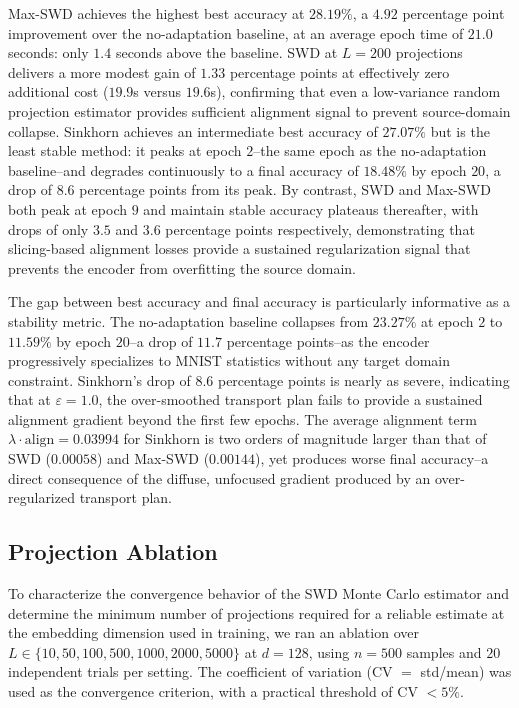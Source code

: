 \documentclass{article}
\begin{document}
	Max-SWD achieves the highest best accuracy at $28.19\%$, a $4.92$ percentage point improvement over the no-adaptation baseline, at an average epoch time of $21.0$ seconds: only $1.4$ seconds above the baseline. SWD at $L = 200$ projections delivers a more modest gain of $1.33$ percentage points at effectively zero additional cost ($19.9$s versus $19.6$s), confirming that even a low-variance random projection estimator provides sufficient alignment signal to prevent source-domain collapse. Sinkhorn achieves an intermediate best accuracy of $27.07\%$ but is the least stable method: it peaks at epoch $2$--the same epoch as the no-adaptation baseline--and degrades continuously to a final accuracy of $18.48\%$ by epoch $20$, a drop of $8.6$ percentage points from its peak. By contrast, SWD and Max-SWD both peak at epoch $9$ and maintain stable accuracy plateaus thereafter, with drops of only $3.5$ and $3.6$ percentage points respectively, demonstrating that slicing-based alignment losses provide a sustained regularization signal that prevents the encoder from overfitting the source domain.
	
	The gap between best accuracy and final accuracy is particularly informative as a stability metric. The no-adaptation baseline collapses from $23.27\%$ at epoch $2$ to $11.59\%$ by epoch $20$--a drop of $11.7$ percentage points--as the encoder progressively specializes to MNIST statistics without any target domain constraint. Sinkhorn's drop of $8.6$ percentage points is nearly as severe, indicating that at $\varepsilon = 1.0$, the over-smoothed transport plan fails to provide a sustained alignment gradient beyond the first few epochs. The average alignment term $\lambda \cdot \mathrm{align} = 0.03994$ for Sinkhorn is two orders of magnitude larger than that of SWD ($0.00058$) and Max-SWD ($0.00144$), yet produces worse final accuracy--a direct consequence of the diffuse, unfocused gradient produced by an over-regularized transport plan.
	
	\subsection{Projection Ablation}
	
	To characterize the convergence behavior of the SWD Monte Carlo estimator and determine the minimum number of projections required for a reliable estimate at the embedding dimension used in training, we ran an ablation over $L \in \{10, 50, 100, 500, 1000, 2000, 5000\}$ at $d = 128$, using $n = 500$ samples and $20$ independent trials per setting. The coefficient of variation (CV $=$ std/mean) was used as the convergence criterion, with a practical threshold of CV $< 5\%$.
	
\end{document}
